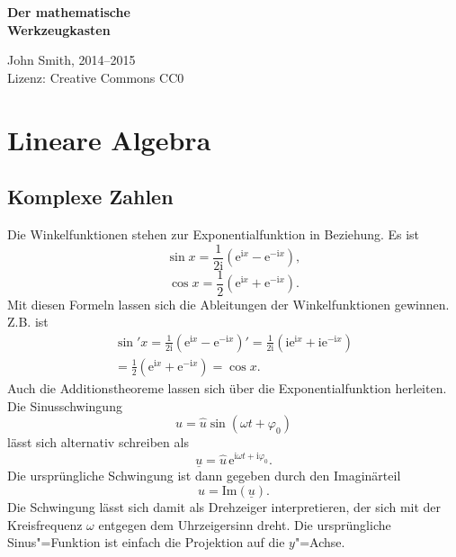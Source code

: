 \documentclass[a4paper,10pt,fleqn,twocolumn,twoside]{article}
\newcommand{\ui}{\mathrm i}
\newcommand{\ee}{\mathrm e}
\begin{document}

\begin{huge}
\noindent
\textbf{Der mathematische\\
Werkzeugkasten}
\par
\end{huge}
\vspace{1em}
\noindent
John Smith, 2014--2015\\
Lizenz: Creative Commons CC0

\tableofcontents



\newpage
\section{Lineare Algebra}
\subsection{Komplexe Zahlen}

Die Winkelfunktionen stehen zur Exponentialfunktion
in Beziehung. Es ist
\[\sin x = \frac{1}{2\ui}(\mathrm{e}^{\ui x}-\mathrm{e}^{-\ui x}),\]
\[\cos x = \frac{1}{2}(\mathrm{e}^{\ui x}+\mathrm{e}^{-\ui x}).\]
%
Mit diesen Formeln lassen sich die Ableitungen der Winkelfunktionen
gewinnen. Z.B. ist
\begin{gather*}
\sin' x = \frac{1}{2\ui}(\ee^{\ui x}-\ee^{-\ui x})'
= \frac{1}{2\ui}(\ui\ee^{\ui x}+\ui\ee^{-\ui x})\\
= \frac{1}{2}(\ee^{\ui x}+\ee^{-\ui x})
= \cos x.
\end{gather*}
Auch die Additionstheoreme lassen sich über die Exponentialfunktion
herleiten. Die Sinusschwingung
\[u = \hat u\sin(\omega t+\varphi_0)\]
%
lässt sich alternativ schreiben als
\[\underline u = \hat u\,\ee^{\ui\omega t+\ui\varphi_0}.\]
%
Die ursprüngliche Schwingung ist dann gegeben durch den Imaginärteil
\[u = \mathrm{Im}(\underline u).\]
%
Die Schwingung lässt sich damit als Drehzeiger interpretieren, der
sich mit der Kreisfrequenz $\omega$ entgegen dem Uhrzeigersinn
dreht. Die ursprüngliche Sinus"=Funktion ist einfach die Projektion
auf die $y$"=Achse.
\end{document}

